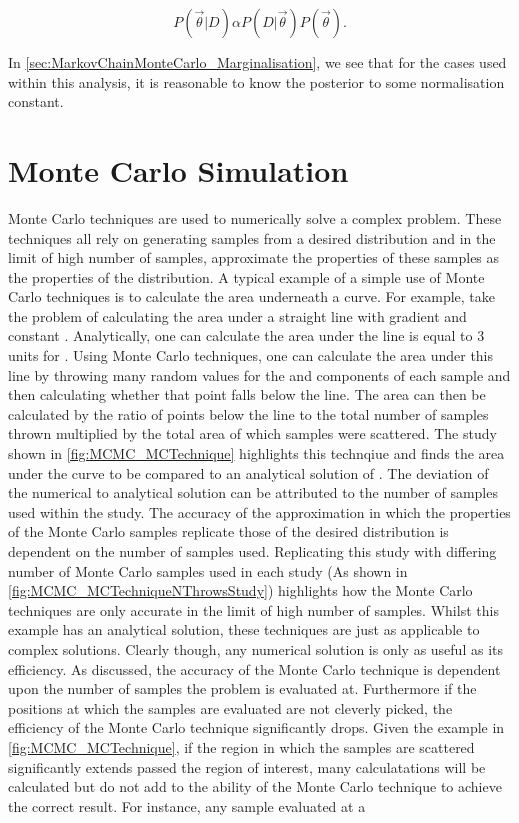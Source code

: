 \begin{equation}
  \label{eq:MarkovChainMonteCarlo_PosteriorDistributionReduced}
  P(\vec{\theta}|D) \alpha P(D|\vec{\theta}) P(\vec{\theta}).
\end{equation}

In \autoref{sec:MarkovChainMonteCarlo_Marginalisation}, we see that for the cases used within this analysis, it is reasonable to know the posterior to some normalisation constant.

\section{Monte Carlo Simulation}
\label{sec:MarkovChainMonteCarlo_MonteCarloSimulation}
Monte Carlo techniques are used to numerically solve a complex problem. These techniques all rely on generating samples from a desired distribution and in the limit of high number of samples, approximate the properties of these samples as the properties of the distribution. A typical example of a simple use of Monte Carlo techniques is to calculate the area underneath a curve. For example, take the problem of calculating the area under a straight line with gradient  and constant . Analytically, one can calculate the area under the line is equal to 3 units for . Using Monte Carlo techniques, one can calculate the area under this line by throwing many random values for the  and  components of each sample and then calculating whether that point falls below the line. The area can then be calculated by the ratio of points below the line to the total number of samples thrown multiplied by the total area of which samples were scattered. The study shown in \autoref{fig:MCMC_MCTechnique} highlights this technqiue and finds the area under the curve to be  compared to an analytical solution of . The deviation of the numerical to analytical solution can be attributed to the number of samples used within the study. The accuracy of the approximation in which the properties of the Monte Carlo samples replicate those of the desired distribution is dependent on the number of samples used. Replicating this study with differing number of Monte Carlo samples used in each study (As shown in \autoref{fig:MCMC_MCTechniqueNThrowsStudy}) highlights how the Monte Carlo techniques are only accurate in the limit of high number of samples. Whilst this example has an analytical solution, these techniques are just as applicable to complex solutions. Clearly though, any numerical solution is only as useful as its efficiency. As discussed, the accuracy of the Monte Carlo technique is dependent upon the number of samples the problem is evaluated at. Furthermore if the positions at which the samples are evaluated are not cleverly picked, the efficiency of the Monte Carlo technique significantly drops. Given the example in \autoref{fig:MCMC_MCTechnique}, if the region in which the samples are scattered significantly extends passed the region of interest, many calculatations will be calculated but do not add to the ability of the Monte Carlo technique to achieve the correct result. For instance, any sample evaluated at a 